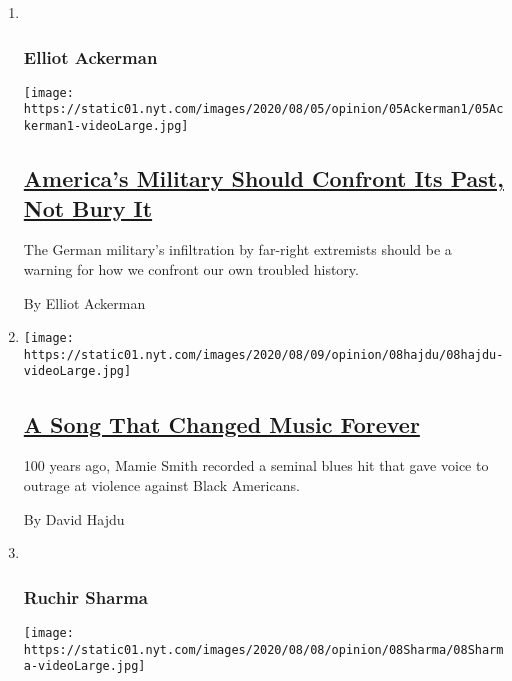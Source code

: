 \begin{enumerate}
\def\labelenumi{\arabic{enumi}.}
\item ~
  \hypertarget{elliot-ackerman}{%
  \subsubsection{Elliot Ackerman}\label{elliot-ackerman}}

  \texttt{[image: https://static01.nyt.com/images/2020/08/05/opinion/05Ackerman1/05Ackerman1-videoLarge.jpg]}

  \hypertarget{americas-military-should-confront-its-past-not-bury-it}{%
  \subsection{\texorpdfstring{\href{/2020/08/08/opinion/nazi-confederate-military-history-ksk.html}{America's
  Military Should Confront Its Past, Not Bury
  It}}{America's Military Should Confront Its Past, Not Bury It}}\label{americas-military-should-confront-its-past-not-bury-it}}

  The German military's infiltration by far-right extremists should be a
  warning for how we confront our own troubled history.

  By Elliot Ackerman
\item
  \texttt{[image: https://static01.nyt.com/images/2020/08/09/opinion/08hajdu/08hajdu-videoLarge.jpg]}

  \hypertarget{a-song-that-changed-music-forever}{%
  \subsection{\texorpdfstring{\href{/2020/08/08/opinion/sunday/crazy-blues-mamie-smith.html}{A
  Song That Changed Music
  Forever}}{A Song That Changed Music Forever}}\label{a-song-that-changed-music-forever}}

  100 years ago, Mamie Smith recorded a seminal blues hit that gave
  voice to outrage at violence against Black Americans.

  By David Hajdu
\item ~
  \hypertarget{ruchir-sharma}{%
  \subsubsection{Ruchir Sharma}\label{ruchir-sharma}}

  \texttt{[image: https://static01.nyt.com/images/2020/08/08/opinion/08Sharma/08Sharma-videoLarge.jpg]}


\end{enumerate}

